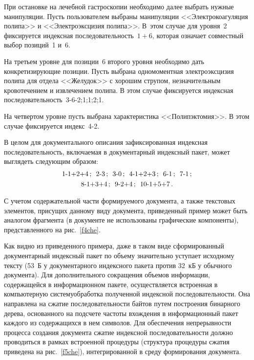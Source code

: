 \begin{multicols}{2}



     
     При остановке на лечебной гастроскопии необходимо далее выбрать 
нужные манипуляции. Пусть пользователем выбраны манипуляции 
<<Электрокоагуляция полипа>> и <<Электроэксцизия полипа>>. В~этом случае 
для уровня~2 фиксируется индексная последовательность~$1+6$, которая 
означает совместный выбор позиций~1 и~6.
     
     На третьем уровне для позиции~6 второго уровня необходимо дать 
конкретизирующие позиции. Пусть выбрана одномоментная электроэксцизия 
полипа для отдела <<Желудок>> с хорошим струпом, незначительным 
кровотечением и извлечением полипа. В этом случае фиксируется индексная 
последовательность~3-6-2;1;1;2;1.
     
     На четвертом уровне пусть выбрана характеристика <<Полипэктомия>>. 
В этом случае фиксируется индекс~4-2.
     
     В целом для документального описания зафиксированная индексная 
последовательность, включаемая в документарный индексный пакет, может 
выглядеть следующим образом:
     \begin{gather*}
     \mbox{1-1+2+4}\,;\enskip \mbox{2-3}\,;\enskip \mbox{3-0}\,;\enskip \mbox{4-1+2+3}\,;\enskip
     \mbox{6-1}\,;\enskip \mbox{7-1}\,;\\
\mbox{8-1+3+4}\,;\enskip \mbox{9-2+4}\,;\enskip \mbox{10-1+5+7}\,.
      \end{gather*}
     
     С учетом содержательной части формируемого документа, а также 
текстовых элементов, присущих данному виду документа, приведенный пример 
может быть аналогом фрагмента (в документе не использованы графические 
компоненты), представленного на рис.~\ref{f4che}.

     
     Как видно из приведенного примера, даже в таком виде сформированный 
документарный индексный пакет по объему значительно уступает исходному 
тексту (53~Б у документарного индексного пакета против 32~кБ у обычного 
документа). Для дополнительного сокращения объемов информации, 
содержащейся в информационном пакете, осуществляется встроенная в 
компьютерную систему\linebreak обработка полученной индексной по\-сле\-до\-ва\-тель\-ности. 
Она направлена на сжатие последовательности байтов путем построения 
бинарного дерева, основанного на подсчете частоты вхождения в 
информационный пакет каждого из содержащихся в нем символов. Для 
обеспечения непрерывности процесса создания документа сжатие индексной 
последовательности должно проводиться в рамках встроенной процедуры 
(структура процедуры сжатия приведена на рис.~\ref{f5che}), интегрированной в 
среду формирования документа.


\end{multicols}
